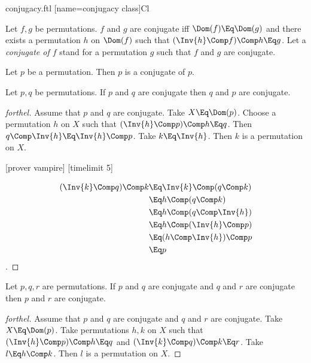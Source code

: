 \documentclass{stex}
\begin{document}
\begin{smodule}{conjugacy.ftl}
  [name=conjugacy class]{\textrm{Cl}}

  \begin{definition}[forthel,for=conjugate]
    Let $f, g$ be permutations.
    $f$ and $g$ are conjugate iff $\Dom(f) \Eq \Dom(g)$ and there exists a permutation $h$ on $\Dom(f)$ such that $(\Inv{h} \Comp f) \Comp h \Eq g$.
    Let a \emph{conjugate of $f$} stand for a permutation $g$ such that $f$ and $g$ are conjugate.
  \end{definition}

  \begin{proposition}[forthel]
    Let $p$ be a permutation.
    Then $p$ is a conjugate of $p$.
  \end{proposition}

  \begin{proposition}[forthel]
    Let $p, q$ be permutations.
    If $p$ and $q$ are conjugate then $q$ and $p$ are conjugate.
  \end{proposition}
  \begin{proof}[forthel]
    Assume that $p$ and $q$ are conjugate.
    Take $X \Eq \Dom(p)$.
    Choose a permutation $h$ on $X$ such that $(\Inv{h} \Comp p) \Comp h \Eq q$.
    Then $q \Comp \Inv{h} \Eq \Inv{h} \Comp p$.
    Take $k \Eq \Inv{h}$.
    Then $k$ is a permutation on $X$.

    [prover vampire]
    [timelimit 5]

    \begin{align*}
            (\Inv{k} \Comp q) \Comp k
      &\Eq  \Inv{k} \Comp (q \Comp k) \\
      &\Eq  h \Comp (q \Comp k) \\
      &\Eq  h \Comp (q \Comp \Inv{h}) \\
      &\Eq  h \Comp (\Inv{h} \Comp p) \\
      &\Eq  (h \Comp \Inv{h}) \Comp p \\
      &\Eq  p
    \end{align*}.
  \end{proof}

  \begin{proposition}[forthel]
    Let $p, q, r$ are permutations.
    If $p$ and $q$ are conjugate and $q$ and $r$ are conjugate then $p$ and $r$ are conjugate.
  \end{proposition}
  \begin{proof}[forthel]
    Assume that $p$ and $q$ are conjugate and $q$ and $r$ are conjugate.
    Take $X \Eq \Dom(p)$.
    Take permutations $h, k$ on $X$ such that $(\Inv{h} \Comp p) \Comp h \Eq q$ and $(\Inv{k} \Comp q) \Comp k \Eq r$.
    Take $l \Eq h \Comp k$.
    Then $l$ is a permutation on $X$.


\end{proof}
\end{smodule}
\end{document}
